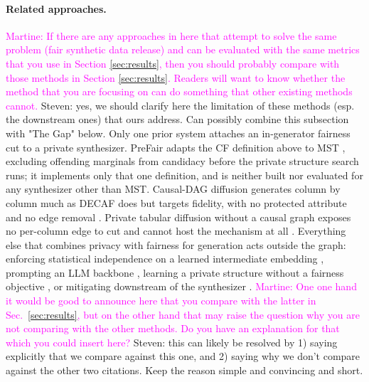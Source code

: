 \documentclass{article}
\newcommand{\martine}[1]{\textcolor{magenta}{Martine: #1}}
\newcommand{\s}[1]{\textcolor{Dandelion}{Steven: #1}}
\begin{document}
\paragraph{Related approaches.} \martine{If there are any approaches in here that attempt to solve the same problem (fair synthetic data release) and can be evaluated with the same metrics that you use in Section \ref{sec:results}, then you should probably compare with those methods in Section \ref{sec:results}. Readers will want to know whether the method that you are focusing on can do something that other existing methods cannot.} \s{yes, we should clarify here the limitation of these methods (esp. the downstream ones) that ours address. Can possibly combine this subsection with "The Gap" below.}
Only one prior system attaches an in-generator fairness cut to a private
synthesizer. PreFair \citep{pujol2023prefair} adapts the CF definition above
to MST \citep{mckenna2021mst}, excluding offending marginals from candidacy
before the private structure search runs; it implements only that one
definition, and is neither built nor evaluated for any synthesizer other than
MST. Causal-DAG diffusion generates column by column much as DECAF does but
targets fidelity, with no protected attribute and no edge removal
\citep{zhang2025causaldifftab,jacob2026tabscm}. Private tabular diffusion
without a causal graph exposes no per-column edge to cut and cannot host the
mechanism at all \citep{zhu2024dptldm}. Everything else that combines
privacy with fairness for generation acts outside the graph: enforcing
statistical independence on a learned intermediate embedding
\citep{hyrup2025flip,sarmin2025pfwgan}, prompting an LLM backbone
\citep{nagesh2025faircausesyn}, learning a private structure without a
fairness objective \citep{jia2025pradagan}, or mitigating downstream of the
synthesizer \citep{angelozzi2026where}. \martine{One one hand it would be good to announce here that you compare with the latter in Sec.~\ref{sec:results}, but on the other hand that may raise the question why you are not comparing with the other methods. Do you have an explanation for that which you could insert here?} \s{this can likely be resolved by 1) saying explicitly that we compare against this one, and 2) saying why we don't compare against the other two citations. Keep the reason simple and convincing and short.}
\end{document}
